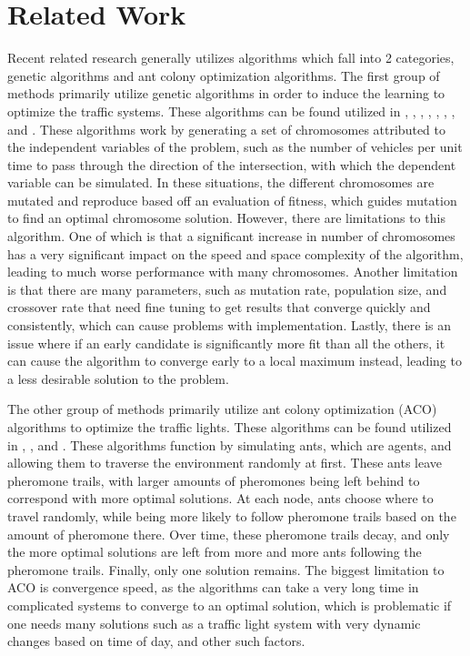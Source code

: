 \documentclass[twocolumn]{article}
\begin{document}
\section{Related Work}
Recent related research generally utilizes algorithms which fall into 2 categories, genetic algorithms and ant colony optimization algorithms.
The first group of methods primarily utilize genetic algorithms in order to induce the learning to optimize the traffic systems.  These algorithms can be found utilized in \cite{Turky}, \cite{Gora}, \cite{Nwiabu}, \cite{Sofronova}, \cite{Semet}, \cite{Mao}, \cite{Tan}, and \cite{Fujdiak}. These algorithms work by generating a set of chromosomes attributed to the independent variables of the problem, such as the number of vehicles per unit time to pass through the direction of the intersection, with which the dependent variable can be simulated. In these situations, the different chromosomes are mutated and reproduce based off an evaluation of fitness, which guides mutation to find an optimal chromosome solution. However, there are limitations to this algorithm. One of which is that a significant increase in number of chromosomes has a very significant impact on the speed and space complexity of the algorithm, leading to much worse performance with many chromosomes. Another limitation is that there are many parameters, such as mutation rate, population size, and crossover rate that need fine tuning to get results that converge quickly and consistently, which can cause problems with implementation. Lastly, there is an issue where if an early candidate is significantly more fit than all the others, it can cause the algorithm to converge early to a local maximum instead, leading to a less desirable solution to the problem.



The other group of methods primarily utilize ant colony optimization (ACO) algorithms to optimize the traffic lights. These algorithms can be found utilized in \cite{Rida}, \cite{Dang-Nhac}, and \cite{Nguyen}. These algorithms function by simulating ants, which are agents, and allowing them to traverse the environment randomly at first. These ants leave pheromone trails, with larger amounts of pheromones being left behind to correspond with more optimal solutions. At each node, ants choose where to travel randomly, while being more likely to follow pheromone trails based on the amount of pheromone there. Over time, these pheromone trails decay, and only the more optimal solutions are left from more and more ants following the pheromone trails.  Finally, only one solution remains. The biggest limitation to ACO is convergence speed, as the algorithms can take a very long time in complicated systems to converge to an optimal solution, which is problematic if one needs many solutions such as a traffic light system with very dynamic changes based on time of day, and other such factors.
\end{document}
